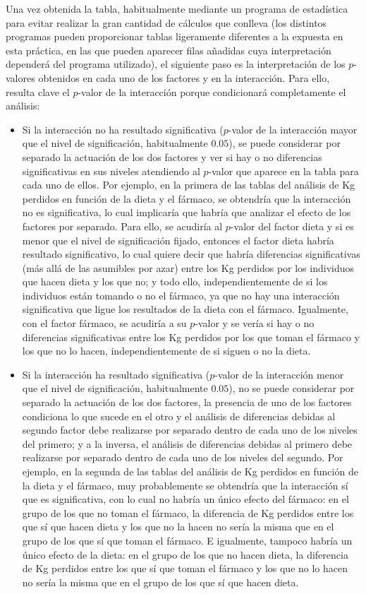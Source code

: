 Una vez obtenida la tabla, habitualmente mediante un programa de estadística para evitar realizar la gran cantidad de cálculos que conlleva
(los distintos programas pueden proporcionar tablas ligeramente diferentes a la expuesta en esta práctica, en las que pueden aparecer filas
añadidas cuya interpretación dependerá del programa utilizado), el siguiente paso es la interpretación de los $p$-valores obtenidos en cada
uno de los factores y en la interacción. Para ello, resulta clave el $p$-valor de la interacción porque condicionará completamente el
análisis:
\begin{itemize}
\item Si la interacción no ha resultado significativa ($p$-valor de la interacción mayor que el nivel de significación, habitualmente
$0.05$), se puede considerar por separado la actuación de los dos factores y ver si hay o no diferencias significativas en sus niveles
atendiendo al $p$-valor que aparece en la tabla para cada uno de ellos. Por ejemplo, en la primera de las tablas del análisis de Kg perdidos
en función de la dieta y el fármaco, se obtendría que la interacción no es significativa, lo cual implicaría que habría que analizar el
efecto de los factores por separado. Para ello, se acudiría al $p$-valor del factor dieta y si es menor que el nivel de significación
fijado, entonces el factor dieta habría resultado significativo, lo cual quiere decir que habría diferencias significativas (más allá de las
asumibles por azar) entre los Kg perdidos por los individuos que hacen dieta y los que no; y todo ello, independientemente de si los
individuos están tomando o no el fármaco, ya que no hay una interacción significativa que ligue los resultados de la dieta con el fármaco.
Igualmente, con el factor fármaco, se acudiría a su $p$-valor y se vería si hay o no diferencias significativas entre los Kg perdidos por
los que toman el fármaco y los que no lo hacen, independientemente de si siguen o no la dieta.
\item Si la interacción ha resultado significativa ($p$-valor de la interacción menor que el nivel de significación, habitualmente $0.05$),
no se puede considerar por separado la actuación de los dos factores, la presencia de uno de los factores condiciona lo que sucede en el
otro y el análisis de diferencias debidas al segundo factor debe realizarse por separado dentro de cada uno de los niveles del primero; y a
la inversa, el análisis de diferencias debidas al primero debe realizarse por separado dentro de cada uno de los niveles del segundo. Por
ejemplo, en la segunda de las tablas del análisis de Kg perdidos en función de la dieta y el fármaco, muy probablemente se obtendría que la
interacción sí que es significativa, con lo cual no habría un único efecto del fármaco: en el grupo de los que no toman el fármaco, la
diferencia de Kg perdidos entre los que sí que hacen dieta y los que no  la hacen no sería la misma que en el grupo de los que sí que toman
el fármaco. E igualmente, tampoco habría un único efecto de la dieta: en el grupo de los que no hacen dieta, la diferencia de Kg perdidos
entre los que sí que toman el fármaco y los que no lo hacen no sería la misma que en el grupo de los que sí que hacen dieta.
\end{itemize}

